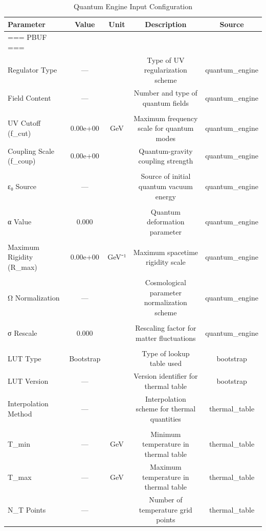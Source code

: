 \begin{table}[htbp]
\centering
\caption{Quantum Engine Input Configuration}
\label{tab:quantum_engine_input_configuration}
\begin{tabular}{lcccc}
\hline
Parameter & Value & Unit & Description & Source \\
\hline
=== PBUF === &  &  &  &  \\
Regulator Type & — &  & Type of UV regularization scheme & quantum_engine \\
Field Content & — &  & Number and type of quantum fields & quantum_engine \\
 &  &  &  &  \\
UV Cutoff (f_cut) & 0.00e+00 & GeV & Maximum frequency scale for quantum modes & quantum_engine \\
Coupling Scale (f_coup) & 0.00e+00 &  & Quantum-gravity coupling strength & quantum_engine \\
 &  &  &  &  \\
ε₀ Source & — &  & Source of initial quantum vacuum energy & quantum_engine \\
 &  &  &  &  \\
α Value & 0.000 &  & Quantum deformation parameter & quantum_engine \\
 &  &  &  &  \\
Maximum Rigidity (R_max) & 0.00e+00 & GeV⁻¹ & Maximum spacetime rigidity scale & quantum_engine \\
 &  &  &  &  \\
Ω Normalization & — &  & Cosmological parameter normalization scheme & quantum_engine \\
 &  &  &  &  \\
σ Rescale & 0.000 &  & Rescaling factor for matter fluctuations & quantum_engine \\
 &  &  &  &  \\
LUT Type & Bootstrap &  & Type of lookup table used & bootstrap \\
LUT Version & — &  & Version identifier for thermal table & bootstrap \\
Interpolation Method & — &  & Interpolation scheme for thermal quantities & thermal_table \\
 &  &  &  &  \\
T_min & — & GeV & Minimum temperature in thermal table & thermal_table \\
T_max & — & GeV & Maximum temperature in thermal table & thermal_table \\
N_T Points & — &  & Number of temperature grid points & thermal_table \\

\end{tabular}
\end{table}
